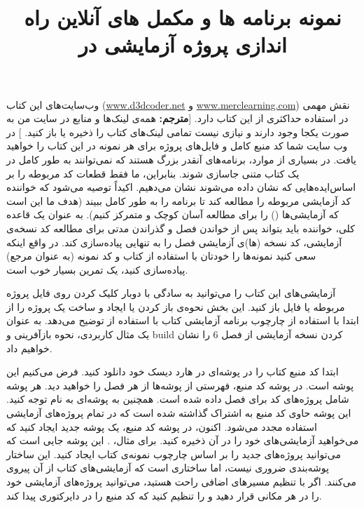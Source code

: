 \title{
    \LARGE
    \textbf{نمونه برنامه ها و مکمل های آنلاین}
} \rullFillWithLine[0.5em]{1pt}
\textbf{\vspace{12pt}}

{
    \Large
    وب‌سایت‌های این کتاب (\href{www.d3dcoder.net}{www.d3dcoder.net} و \href{www.merclearning.com}{www.merclearning.com}) نقش مهمی در استفاده حداکثری از این کتاب دارد. [\textbf{مترجم:} همه‌ی لینک‌ها و منابع در سایت من به صورت یکجا وجود دارند و نیازی نیست تمامی لینک‌های کتاب را ذخیره یا باز کنید. ]
    در وب سایت شما کد منبع کامل و فایل‌های پروژه برای هر نمونه در این کتاب را خواهید یافت.
    در بسیاری از موارد، برنامه‌های  آنقدر بزرگ هستند که نمی‌توانند به طور کامل در یک کتاب متنی جاسازی شوند. بنابراین، ما فقط قطعات کد مربوطه را بر اساس‌ایده‌هایی که نشان داده می‌شوند نشان می‌دهیم.
    اکیداً توصیه می‌شود که خواننده کد آزمایشی مربوطه را مطالعه کند تا برنامه را به طور کامل ببیند (هدف ما این است که آزمایشی‌ها () را برای مطالعه آسان کوچک و متمرکز کنیم). به عنوان یک قاعده کلی، خواننده باید بتواند پس از خواندن فصل و گذراندن مدتی برای مطالعه کد نسخه‌ی آزمایشی، کد نسخه (ها)ی آزمایشی فصل را به تنهایی پیاده‌سازی کند.
در واقع اینکه سعی کنید نمونه‌ها را خودتان با استفاده از کتاب و کد نمونه (به عنوان مرجع) پیاده‌سازی کنید، یک تمرین بسیار خوب است.
}
\textbf{\vspace{25pt}}

\title{
    \LARGE
    \textbf{راه اندازی پروژه آزمایشی در }
} \rullFillWithLine[0.5em]{1pt}
\textbf{\vspace{12pt}}

{
    \Large
    آزمایشی‌های این کتاب را می‌توانید به سادگی با دوبار کلیک کردن روی فایل پروژه مربوطه  یا فایل  باز کنید.
    این بخش نحوه‌ی باز کردن یا ایجاد و ساخت یک پروژه را از ابتدا با استفاده از چارچوب برنامه آزمایشی کتاب با استفاده از  توضیح می‌دهد.
    به عنوان یک مثال کاربردی، نحوه بازآفرینی و build کردن نسخه آزمایشی  از فصل 6 را نشان خواهیم داد.
}
\textbf{\vspace{25pt}}

\title{
    \Large
}

{
    \Large
    ابتدا کد منبع کتاب را در پوشه‌ای در هارد دیسک خود دانلود کنید.
    فرض می‌کنیم این پوشه  است.
    در پوشه کد منبع، فهرستی از پوشه‌ها از هر فصل را خواهید دید. هر پوشه شامل پروژه‌های کد برای فصل داده شده است.
    همچنین به پوشه‌ای به نام  توجه کنید. این پوشه حاوی کد منبع به اشتراک گذاشته شده است که در تمام پروژه‌های آزمایشی استفاده مجدد می‌شود.
    اکنون، در پوشه کد منبع، یک پوشه جدید ایجاد کنید که می‌خواهید آزمایشی‌های خود را در آن ذخیره کنید.
    برای مثال، . این پوشه جایی است که می‌توانید پروژه‌های جدید را بر اساس چارچوب نمونه‌ی کتاب ایجاد کنید.
}
{
    \Large
    این ساختار پوشه‌بندی ضروری نیست، اما ساختاری است که آزمایشی‌های کتاب از آن پیروی می‌کنند. اگر با تنظیم مسیر‌های اضافی راحت هستید، می‌توانید پروژه‌های آزمایشی خود را در هر مکانی قرار دهید و  را تنظیم کنید که کد منبع را در دایرکتوری  پیدا کند.
}
\textbf{\vspace{25pt}}

